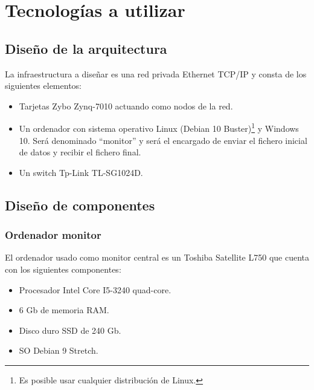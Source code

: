 \section{Tecnologías a utilizar}
\subsection{Diseño de la arquitectura}
La infraestructura a diseñar es una red privada Ethernet TCP/IP y consta de los siguientes elementos:
\begin{itemize}
	\item Tarjetas Zybo Zynq-7010 actuando como nodos de la red.
	\item Un ordenador con sistema operativo Linux (Debian 10 Buster)\footnote{Es posible usar cualquier distribución de Linux.} y Windows 10. Será denominado ``monitor'' y será el encargado de enviar el fichero inicial de datos y recibir el fichero final.
	\item Un switch Tp-Link TL-SG1024D.
\end{itemize}


\subsection{Diseño de componentes}
\subsubsection{Ordenador monitor}
El ordenador usado como monitor central es un Toshiba Satellite L750 que cuenta con los siguientes componentes:
\begin{itemize}
	\item Procesador Intel Core I5-3240 quad-core.
	\item 6 Gb de memoria RAM.
	\item Disco duro SSD de 240 Gb.
	\item SO Debian 9 Stretch.
\end{itemize}

